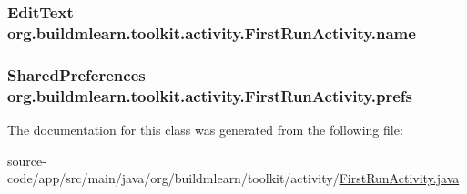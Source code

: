 \subsubsection[{\texorpdfstring{name}{name}}]{\setlength{\rightskip}{0pt plus 5cm}Edit\+Text org.\+buildmlearn.\+toolkit.\+activity.\+First\+Run\+Activity.\+name\hspace{0.3cm}{\ttfamily [private]}}\hypertarget{classorg_1_1buildmlearn_1_1toolkit_1_1activity_1_1FirstRunActivity_a955ca4cb27e9e7e230f2c2552e291192}{}\label{classorg_1_1buildmlearn_1_1toolkit_1_1activity_1_1FirstRunActivity_a955ca4cb27e9e7e230f2c2552e291192}
\subsubsection[{\texorpdfstring{prefs}{prefs}}]{\setlength{\rightskip}{0pt plus 5cm}Shared\+Preferences org.\+buildmlearn.\+toolkit.\+activity.\+First\+Run\+Activity.\+prefs\hspace{0.3cm}{\ttfamily [private]}}\hypertarget{classorg_1_1buildmlearn_1_1toolkit_1_1activity_1_1FirstRunActivity_aa1cc5d447dab2d50362d3b4160a28fea}{}\label{classorg_1_1buildmlearn_1_1toolkit_1_1activity_1_1FirstRunActivity_aa1cc5d447dab2d50362d3b4160a28fea}


The documentation for this class was generated from the following file\+:\begin{DoxyCompactItemize}
\item 
source-\/code/app/src/main/java/org/buildmlearn/toolkit/activity/\hyperlink{FirstRunActivity_8java}{First\+Run\+Activity.\+java}\end{DoxyCompactItemize}
